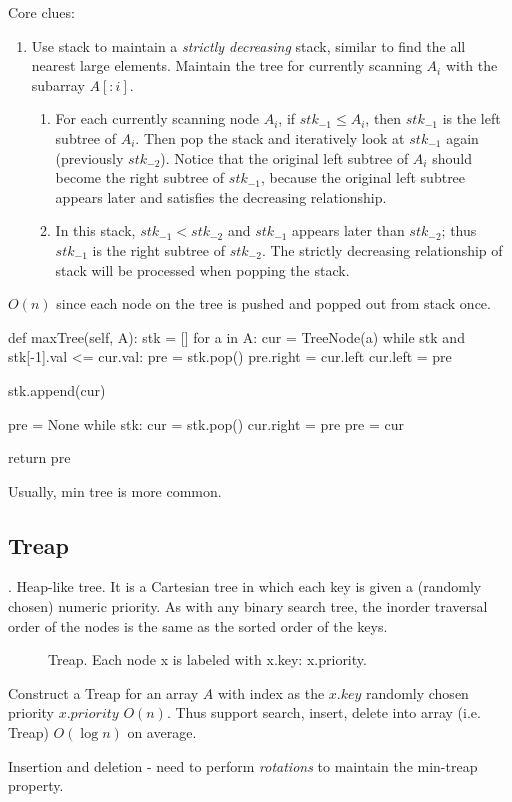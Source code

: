 Core clues:
\begin{enumerate}
\item Use stack to maintain a \textit{strictly decreasing} stack, similar to find the all nearest large elements.
\itm Maintain the tree for currently scanning $A_i$ with the subarray $A[:i]$.
\begin{enumerate}
\item {} For each currently scanning node $A_i$, if ${stk}_{-1} \leq A_i$, then ${stk}_{-1}$ is the left subtree of $A_i$. Then pop the stack and iteratively look at ${stk}_{-1}$ again (previously ${stk}_{-2}$). Notice that the original left subtree of $A_i$ should become the right subtree of ${stk}_{-1} $, because the original left subtree appears later and satisfies the decreasing relationship.
\item {} In this stack, ${stk}_{-1} < {stk}_{-2}$ and ${stk}_{-1}$ appears later than ${stk}_{-2}$; thus ${stk}_{-1}$ is the right subtree of ${stk}_{-2}$. The strictly decreasing relationship of stack will be processed when popping the stack. 
\end{enumerate}
\end{enumerate}

$O(n)$ since each node on the tree is pushed and popped out from stack once.


\begin{python}
def maxTree(self, A):
    stk = []
    for a in A:
        cur = TreeNode(a)
        while stk and stk[-1].val <= cur.val:
            pre = stk.pop()
            pre.right = cur.left
            cur.left = pre

        stk.append(cur)

    pre = None
    while stk:
        cur = stk.pop()
        cur.right = pre
        pre = cur

    return pre
\end{python}

Usually, min tree is more common. 
\subsection{Treap}
. Heap-like tree. It is a Cartesian tree in which each key is given a (randomly chosen) numeric priority. As with any binary search tree, the inorder traversal order of the nodes is the same as the sorted order of the keys.

\begin{figure}[hbtp]
\centering
{}
\caption{Treap. Each node x is labeled with x.key: x.priority.}
\label{fig:treap}
\end{figure}

Construct a Treap for an array $A$ with index as the $x.key$ randomly chosen priority $x.priority$ $O(n)$. Thus support search, insert, delete into array (i.e. Treap) $O(\log n)$ on average. 

Insertion and deletion - need to perform \textit{rotations} to maintain the min-treap property. 
